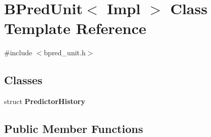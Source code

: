 \hypertarget{classBPredUnit}{
\section{BPredUnit$<$ Impl $>$ Class Template Reference}
\label{classBPredUnit}
}


{\ttfamily \#include $<$bpred\_\-unit.h$>$}

\subsection*{Classes}
\begin{DoxyCompactItemize}
\item 
struct {\bfseries PredictorHistory}
\end{DoxyCompactItemize}
\subsection*{Public Member Functions}
